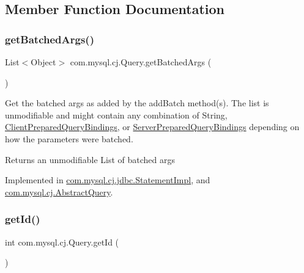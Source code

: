 \subsection{Member Function Documentation}
\mbox{\label{interfacecom_1_1mysql_1_1cj_1_1_query_af927782ce04741b0b0d3447e9b4f2a08}} 
\subsubsection{\texorpdfstring{get\+Batched\+Args()}{getBatchedArgs()}}
{\footnotesize\ttfamily List$<$Object$>$ com.\+mysql.\+cj.\+Query.\+get\+Batched\+Args (\begin{DoxyParamCaption}{ }\end{DoxyParamCaption})}

Get the batched args as added by the add\+Batch method(s). The list is unmodifiable and might contain any combination of String, \mbox{\hyperlink{classcom_1_1mysql_1_1cj_1_1_client_prepared_query_bindings}{Client\+Prepared\+Query\+Bindings}}, or \mbox{\hyperlink{classcom_1_1mysql_1_1cj_1_1_server_prepared_query_bindings}{Server\+Prepared\+Query\+Bindings}} depending on how the parameters were batched.

\begin{DoxyReturn}{Returns}
an unmodifiable List of batched args 
\end{DoxyReturn}


Implemented in \mbox{\hyperlink{classcom_1_1mysql_1_1cj_1_1jdbc_1_1_statement_impl_a19609eb768e13632f7a8eb0fd14cdfd5}{com.\+mysql.\+cj.\+jdbc.\+Statement\+Impl}}, and \mbox{\hyperlink{classcom_1_1mysql_1_1cj_1_1_abstract_query_aef6b23f8de5efa38c0334c9245c346bf}{com.\+mysql.\+cj.\+Abstract\+Query}}.

\mbox{\label{interfacecom_1_1mysql_1_1cj_1_1_query_a29f450bbae1063765d434e3b89bdd26e}} 
\subsubsection{\texorpdfstring{get\+Id()}{getId()}}
{\footnotesize\ttfamily int com.\+mysql.\+cj.\+Query.\+get\+Id (\begin{DoxyParamCaption}{ }\end{DoxyParamCaption})}

